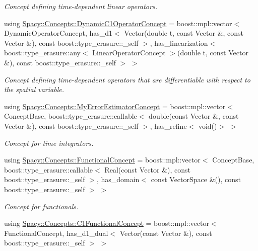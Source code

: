 \begin{DoxyCompactItemize}
\begin{DoxyCompactList}\small\item\em Concept defining time-\/dependent linear operators. \end{DoxyCompactList}\item 
using \hyperlink{group__ConceptGroup_gaa7ef0ce2d66b0610035541b580564b11_gaa7ef0ce2d66b0610035541b580564b11}{Spacy\+::\+Concepts\+::\+Dynamic\+C1\+Operator\+Concept} = boost\+::mpl\+::vector$<$ Dynamic\+Operator\+Concept, has\+\_\+d1$<$ Vector(double t, const Vector \&, const Vector \&), const boost\+::type\+\_\+erasure\+::\+\_\+self $>$, has\+\_\+linearization$<$ boost\+::type\+\_\+erasure\+::any$<$ Linear\+Operator\+Concept $>$(double t, const Vector \&), const boost\+::type\+\_\+erasure\+::\+\_\+self $>$ $>$
\begin{DoxyCompactList}\small\item\em Concept defining time-\/dependent operators that are differentiable with respect to the spatial variable. \end{DoxyCompactList}\item 
using \hyperlink{group__ConceptGroup_ga6b5c97b0e58318ef98c43a9b8a7dae08_ga6b5c97b0e58318ef98c43a9b8a7dae08}{Spacy\+::\+Concepts\+::\+My\+Error\+Estimator\+Concept} = boost\+::mpl\+::vector$<$ Concept\+Base, boost\+::type\+\_\+erasure\+::callable$<$ double(const Vector \&, const Vector \&), const boost\+::type\+\_\+erasure\+::\+\_\+self $>$, has\+\_\+refine$<$ void()$>$ $>$
\begin{DoxyCompactList}\small\item\em Concept for time integrators. \end{DoxyCompactList}\item 
using \hyperlink{group__ConceptGroup_ga5273b50bd3e8c9a3f5a1e6b5f170836d_ga5273b50bd3e8c9a3f5a1e6b5f170836d}{Spacy\+::\+Concepts\+::\+Functional\+Concept} = boost\+::mpl\+::vector$<$ Concept\+Base, boost\+::type\+\_\+erasure\+::callable$<$ Real(const Vector \&), const boost\+::type\+\_\+erasure\+::\+\_\+self $>$, has\+\_\+domain$<$ const Vector\+Space \&(), const boost\+::type\+\_\+erasure\+::\+\_\+self $>$ $>$
\begin{DoxyCompactList}\small\item\em Concept for functionals. \end{DoxyCompactList}\item 
using \hyperlink{group__ConceptGroup_ga205b55d8291e0f2e143f116cf78bc54f_ga205b55d8291e0f2e143f116cf78bc54f}{Spacy\+::\+Concepts\+::\+C1\+Functional\+Concept} = boost\+::mpl\+::vector$<$ Functional\+Concept, has\+\_\+d1\+\_\+dual$<$ Vector(const Vector \&), const boost\+::type\+\_\+erasure\+::\+\_\+self $>$ $>$

\end{DoxyCompactItemize}
